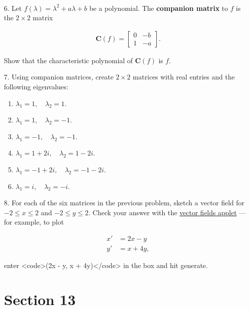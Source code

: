 \documentclass{article}
\begin{document}
~\\

6. Let $f(\lambda) = \lambda^2 + a\lambda + b$ be a polynomial. The \textbf{companion matrix} to $f$ is the $2 \times 2$ matrix

\begin{align*}
	\mathbf{C}(f) = \left[\begin{array}{cc}0& -b \\ 1& -a\end{array}\right].
\end{align*}

Show that the characteristic polynomial of $\mathbf{C}(f)$ is $f$.

7. Using companion matrices, create $2 \times 2$ matrices with real entries and the following eigenvalues:

\begin{enumerate}

	\item $\lambda_1 = 1, \quad \lambda_2 = 1$.

	\item $\lambda_1 = 1, \quad \lambda_2 = -1$.

	\item $\lambda_1 = -1, \quad \lambda_2 = -1$.

	\item $\lambda_1 = 1 + 2i, \quad \lambda_2 = 1 - 2i$.

	\item $\lambda_1 = -1 + 2i, \quad \lambda_2 = -1 - 2i$.

	\item $\lambda_1 = i, \quad \lambda_2 = -i$.

\end{enumerate}

8. For each of the six matrices in the previous problem, sketch a vector field for $-2 \leq x \leq 2$ and $-2 \leq y \leq 2$. Check your answer with the \href{https://cruzgodar.com/applets/vector-fields}{vector fields applet} --- for example, to plot

\begin{align*}
	x' &= 2x - y\\
	y' &= x + 4y,
\end{align*}

enter <code>(2x - y, x + 4y)</code> in the box and hit generate.

\section{Section 13}
\end{document}
